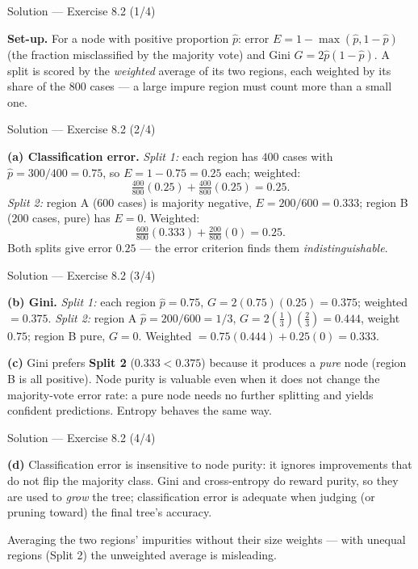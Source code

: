 \documentclass[aspectratio=169,11pt]{beamer}
\begin{document}
\begin{frame}{Solution --- Exercise 8.2 (1/4)}
\begin{solutionbox}
\textbf{Set-up.} For a node with positive proportion $\hat p$: error $E=1-\max(\hat p,1-\hat p)$ (the fraction misclassified by the majority vote) and Gini $G=2\hat p(1-\hat p)$. A split is scored by the \emph{weighted} average of its two regions, each weighted by its share of the $800$ cases --- a large impure region must count more than a small one.
\end{solutionbox}
\end{frame}

\begin{frame}{Solution --- Exercise 8.2 (2/4)}
\begin{solutionbox}
\medskip
\textbf{(a) Classification error.}
\emph{Split 1:} each region has $400$ cases with $\hat p=300/400=0.75$, so $E=1-0.75=0.25$ each; weighted:
\[ \tfrac{400}{800}(0.25)+\tfrac{400}{800}(0.25)=0.25. \]
\emph{Split 2:} region A ($600$ cases) is majority negative, $E=200/600=0.333$; region B ($200$ cases, pure) has $E=0$. Weighted:
\[ \tfrac{600}{800}(0.333)+\tfrac{200}{800}(0)=0.25. \]
Both splits give error $0.25$ --- the error criterion finds them \emph{indistinguishable}.
\end{solutionbox}
\end{frame}

\begin{frame}{Solution --- Exercise 8.2 (3/4)}
\begin{solutionbox}
\textbf{(b) Gini.}
\emph{Split 1:} each region $\hat p=0.75$, $G=2(0.75)(0.25)=0.375$; weighted $=0.375$.
\emph{Split 2:} region A $\hat p=200/600=1/3$, $G=2(\tfrac13)(\tfrac23)=0.444$, weight $0.75$; region B pure, $G=0$. Weighted $=0.75(0.444)+0.25(0)=0.333$.

\medskip
\textbf{(c)} Gini prefers \textbf{Split 2} ($0.333<0.375$) because it produces a \emph{pure} node (region B is all positive). Node purity is valuable even when it does not change the majority-vote error rate: a pure node needs no further splitting and yields confident predictions. Entropy behaves the same way.
\end{solutionbox}
\end{frame}

\begin{frame}{Solution --- Exercise 8.2 (4/4)}
\begin{solutionbox}
\medskip
\textbf{(d)} Classification error is insensitive to node purity: it ignores improvements that do not flip the majority class. Gini and cross-entropy do reward purity, so they are used to \emph{grow} the tree; classification error is adequate when judging (or pruning toward) the final tree's accuracy.
\end{solutionbox}
\begin{mistake}
Averaging the two regions' impurities without their size weights --- with unequal regions (Split 2) the unweighted average is misleading.
\end{mistake}
\end{frame}
\end{document}
